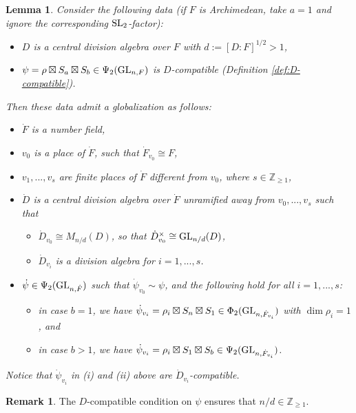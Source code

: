 \documentclass[11pt,reqno]{amsart}
\theoremstyle{plain}
\newtheorem{lem}[thm]{Lemma}
\theoremstyle{definition}
\newtheorem{rem}[thm]{Remark}
\newcommand{\Z}{\mathbb{Z}}
\newcommand{\SL}{\tu{SL}}
\newcommand{\GL}{\tu{GL}}
\newcommand{\tu}{\textup}
\numberwithin{equation}{subsection}
\begin{document}
\begin{lem}\label{lem:globalization-parameter} Consider the following data (if $F$ is Archimedean, take $a=1$ and ignore the corresponding $\SL_2$-factor):
\begin{itemize}
    \item $D$ is a central division algebra over $F$ with $d:=[D:F]^{1/2}>1$,
    \item $\psi=\rho\boxtimes S_a\boxtimes S_b\in \Psi_2(\GL_{n,F})$ is $D$-compatible (Definition \ref{def:D-compatible}).
\end{itemize}
Then these data admit a globalization as follows: 
\begin{itemize}
    \item $\dot F$ is a number field,
    \item $v_0$ is a place of $\dot F$, such that $\dot F_{v_0}\cong F$,
    \item $v_1,...,v_s$ are finite places of $\dot F$ different from $v_0$, where $s\in \Z_{\ge1}$,
    \item $\dot D$ is a central division algebra over $\dot F$ unramified away from $v_0,...,v_s$ such that 
    \begin{itemize}
        \item $\dot D_{v_0}\cong M_{n/d}(D)$, so that $\dot D_{v_0}^\times\cong \GL_{n/d}(D)$,
        \item $\dot D_{v_i}$ is a division algebra for $i=1,...,s$.
    \end{itemize}
    \item $\dot\psi\in \Psi_2(\GL_{n,\dot F})$ such that $\dot\psi_{v_0}\sim \psi$, and
    the following hold for all $i=1,...,s$:
    \begin{itemize}
        \item[(i)] in case $b=1$, we have $\dot \psi_{v_i}=\rho_i\boxtimes S_n \boxtimes S_1\in\Phi_{2}(\GL_{n,\dot F_{v_i}})$ with $\dim\rho_i=1$, and
        \item[(ii)] in case $b>1$, we have $\dot \psi_{v_i}=\rho_i\boxtimes S_1\boxtimes S_b\in\Psi_{2}(\GL_{n,\dot F_{v_i}})$.
    \end{itemize}
\end{itemize}
Notice that $\dot\psi_{v_i}$ in (i) and (ii) above are $\dot D_{v_i}$-compatible.
\end{lem}

\begin{rem}
The $D$-compatible condition on $\psi$ ensures that $n/d\in \Z_{\ge1}$.
\end{rem}
\end{document}
